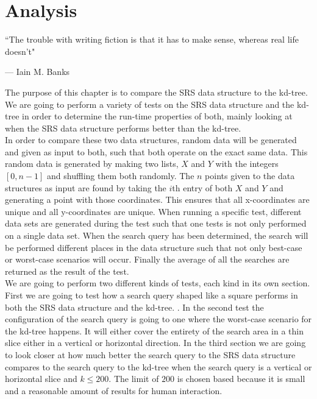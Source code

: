 \chapter{Analysis}
\label{chap:analysis}
\epigraph{``The trouble with writing fiction is that it has to make sense, whereas real life doesn't"}{--- \textup{Iain M. Banks}}

The purpose of this chapter is to compare the SRS data structure to the kd-tree. We are going to perform a variety of tests on the SRS data structure and the kd-tree in order to determine the run-time properties of both, mainly looking at when the SRS data structure performs better than the kd-tree.\\


In order to compare these two data structures, random data will be generated and given as input to both, such that both operate on the exact same data. This random data is generated by making two lists, $X$ and $Y$ with the integers $[0,n-1]$ and shuffling them both randomly. The $n$ points given to the data structures as input are found by taking the $i$th entry of both $X$ and $Y$ and generating a point with those coordinates. This ensures that all x-coordinates are unique and all y-coordinates are unique.  When running a specific test, different data sets are generated during the test such that one tests is not only performed on a single data set. When the search query has been determined, the search will be performed different places in the data structure such that not only best-case or worst-case scenarios will occur. Finally the average of all the searches are returned as the result of the test.\\

We are going to perform two different kinds of tests, each kind in its own section. First we are going to test how a search query shaped like a square performs in both the SRS data structure and the kd-tree. . In the second test the configuration of the search query is going to one where the worst-case scenario for the kd-tree happens. It will either cover the entirety of the search area in a thin slice either in a vertical or horizontal direction. In the third section we are going to look closer at how much better the search query to the SRS data structure compares to the search query to the kd-tree when the search query is a vertical or horizontal slice and $k \leq 200$. The limit of $200$ is chosen based because it is small and a reasonable amount of results for human interaction.

